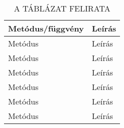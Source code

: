 \begin{table}[h]
	\caption{A TÁBLÁZAT FELIRATA}
	\centering
	\small
	\begin{tabular}{| p{7.0cm} | p{7.0cm} |}
		\hline
		\rowcolor{MyTableColor} \textbf{Metódus/függvény} & \textbf{Leírás} \\
		\hline
		Metódus & Leírás \\
		\hline
		Metódus & Leírás \\
		\hline
		Metódus & Leírás \\
		\hline
		Metódus & Leírás \\
		\hline
		Metódus & Leírás \\
		\hline
		Metódus & Leírás \\
		\hline
	\end{tabular}
	\normalsize
	\label{tab:TABLACIMKE}
\end{table}